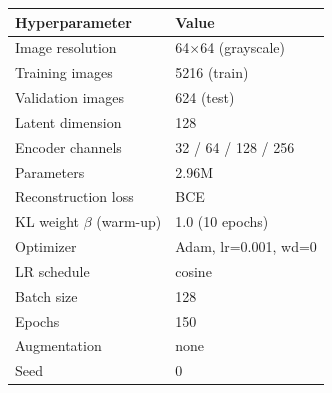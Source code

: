 \begin{tabular}{ll}
\toprule
Hyperparameter & Value \\
\midrule
Image resolution & 64$\times$64 (grayscale) \\
Training images & 5216 (train) \\
Validation images & 624 (test) \\
Latent dimension & 128 \\
Encoder channels & 32 / 64 / 128 / 256 \\
Parameters & 2.96M \\
Reconstruction loss & BCE \\
KL weight $\beta$ (warm-up) & 1.0 (10 epochs) \\
Optimizer & Adam, lr=0.001, wd=0 \\
LR schedule & cosine \\
Batch size & 128 \\
Epochs & 150 \\
Augmentation & none \\
Seed & 0 \\
\bottomrule
\end{tabular}

